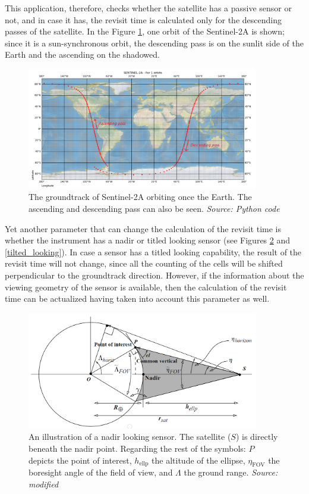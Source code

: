 This application, therefore, checks whether the satellite has a passive sensor or not, and in case it has, the revisit time is calculated only for the descending passes of the satellite. In the Figure \ref{ascending-descending}, one orbit of the Sentinel-2A is shown; since it is a sun-synchronous orbit, the descending pass is on the sunlit side of the Earth and the ascending on the shadowed.

\begin{figure}
\centering
\includegraphics[width=0.9\textwidth]{Images/ascending-descending.png}\caption{The groundtrack of Sentinel-2A orbiting once the Earth. The ascending and descending pass can also be seen. \textit{Source: Python code}}
\label{ascending-descending}
\end{figure}

Yet another parameter that can change the calculation of the revisit time is whether the instrument has a nadir or titled looking sensor (see Figures \ref{nadir_looking} and \ref{tilted_looking}). In case a sensor has a titled looking capability, the result of the revisit time will not change, since all the counting of the cells will be shifted perpendicular to the groundtrack direction. However, if the information about the viewing geometry of the sensor is available, then the calculation of the revisit time can be actualized having taken into account this parameter as well.

\begin{figure}
\centering
\includegraphics[width=0.9\textwidth]{Images/nadir_looking.png}\caption{An illustration of a nadir looking sensor. The satellite ($S$) is directly beneath the nadir point. Regarding the rest of the symbols: $P$ depicts the point of interest, $h_{\text{ellp}}$ the altitude of the ellipse, $\eta_{\text{FOV}}$ the boresight angle of the field of view, and $\Lambda$ the ground range. \textit{Source: modified \cite{Vallado}}}
\label{nadir_looking}
\end{figure}

